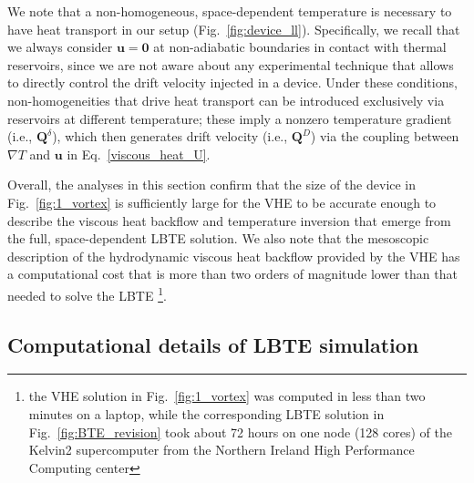 \documentclass[
prb,
twocolumn,
superscriptaddress,
 amsmath,amssymb,
 aps,
longbibliography,
]{revtex4-2}
\begin{document}
We note that a non-homogeneous, space-dependent temperature is necessary to have heat transport in our setup (Fig.~\ref{fig:device_ll}). Specifically, we recall that we always consider $\bm{u}=\bm{0}$ at non-adiabatic boundaries in contact with thermal reservoirs, since we are not aware about any experimental technique that allows to directly control the drift velocity injected in a device. Under these conditions, non-homogeneities that drive heat transport can be introduced exclusively via reservoirs at different temperature; these imply a nonzero temperature gradient (i.e., $\bm{Q}^\delta$), which then generates drift velocity (i.e., $\bm{Q}^D$) via the coupling between $\nabla T$ and $\bm{u}$ in Eq.~\ref{viscous_heat_U}.

Overall, the analyses in this section confirm that the size of the device in Fig.~\ref{fig:1_vortex} is sufficiently large for the VHE to be accurate enough to describe the viscous heat backflow and temperature inversion that emerge from the full, space-dependent LBTE solution.
We also note that the mesoscopic description of the hydrodynamic viscous heat backflow provided by the VHE has a computational cost that is more than two orders of magnitude lower than that needed to solve the LBTE \footnote{the VHE solution in Fig.~\ref{fig:1_vortex} was computed in less than two minutes on a laptop, while the corresponding LBTE solution in Fig.~\ref{fig:BTE_revision} took about 72 hours on one node (128 cores) of the Kelvin2 supercomputer from the Northern Ireland High Performance Computing center}.

\subsection{Computational details of LBTE simulation}
\label{sub:computational_details_for_lbte_simulation}
\end{document}
